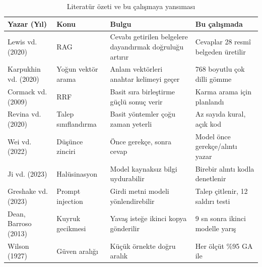 \begin{table}[!ht]
\centering
\caption{Literatür özeti ve bu çalışmaya yansıması}
\label{tab:literatur}
\footnotesize
\renewcommand{\arraystretch}{1.25}
\begin{tabularx}{\textwidth}{@{}p{2.5cm} p{2.6cm} X X@{}}
\toprule
\textbf{Yazar (Yıl)} & \textbf{Konu} & \textbf{Bulgu} & \textbf{Bu çalışmada} \\
\midrule
Lewis vd. (2020) \cite{lewis2020} & RAG & Cevabı getirilen belgelere dayandırmak doğruluğu artırır & Cevaplar 28 resmî belgeden üretilir \\
Karpukhin vd. (2020) \cite{karpukhin2020} & Yoğun vektör arama & Anlam vektörleri anahtar kelimeyi geçer & 768 boyutlu çok dilli gömme \\
Cormack vd. (2009) \cite{cormack2009} & RRF & Basit sıra birleştirme güçlü sonuç verir & Karma arama için planlandı \\
Revina vd. (2020) \cite{revina2020} & Talep sınıflandırma & Basit yöntemler çoğu zaman yeterli & Az sayıda kural, açık kod \\
Wei vd. (2022) \cite{wei2022} & Düşünce zinciri & Önce gerekçe, sonra cevap & Model önce gerekçe/alıntı yazar \\
Ji vd. (2023) \cite{ji2023} & Halüsinasyon & Model kaynaksız bilgi uydurabilir & Birebir alıntı kodla denetlenir \\
Greshake vd. (2023) \cite{greshake2023} & Prompt injection & Girdi metni modeli yönlendirebilir & Talep çitlenir, 12 saldırı testi \\
Dean, Barroso (2013) \cite{dean2013} & Kuyruk gecikmesi & Yavaş isteğe ikinci kopya gönderilir & 9 sn sonra ikinci modelle yarış \\
Wilson (1927) \cite{wilson1927} & Güven aralığı & Küçük örnekte doğru aralık & Her ölçüt \%95 GA ile \\
\bottomrule
\end{tabularx}
\end{table}

